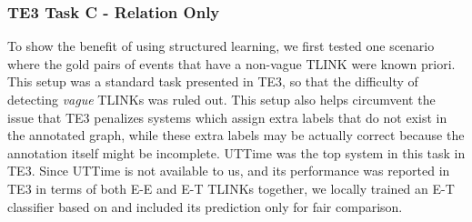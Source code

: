 \documentclass[11pt,letterpaper]{article}
\newcommand{\ignore}[1]{}
\newcommand{\final}[1]{#1}
\begin{document}
{\subsubsection{\final{TE3 Task C - Relation Only}}
\ignore{1. given gold non-vague pairs, show the improvement of SP. Need: local results trained on TBAQ}
\ignore{2. without gold non-vague pairs, show the improvement of SP, post-filtering, and CoDL. Need: local results trained on TBAQ; codl+postfilter results}
\ignore{3. compare with caveo. trained on TD-train, compare results on TD-dev and TD-test. Need: results on TD-dev.}
\ignore{4. compare with caveo. trained on TD-train, compare results on TE3-PT}

To show the benefit of using structured learning, we first tested one scenario where the gold pairs of events that have a non-vague TLINK were known priori. This setup was a standard task presented in TE3, so that the difficulty of detecting {\em vague} TLINKs was ruled out. 
\final{This setup also helps circumvent the issue that TE3 penalizes systems which assign extra labels that do not exist in the annotated graph, while these extra labels may be actually correct because the annotation itself might be incomplete.}
UTTime \citep{laokulrat2013uttime} was the top system in this task in TE3. 
Since UTTime is not available to us, and its performance was reported in TE3 in terms of both E-E and E-T TLINKs together, we locally trained an E-T classifier based on \citet{DoLuRo12} and included its prediction only for fair comparison. 


}
\end{document}
